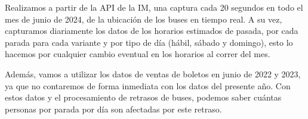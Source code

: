 \documentclass[journal]{IEEEtran}
\begin{document}
Realizamos a partir de la API de la IM, una captura cada 20 segundos en todo el mes de junio de 2024, de la ubicación de los buses en tiempo real. A su vez, capturamos diariamente los datos de los horarios estimados de pasada, por cada parada para cada variante y por tipo de día (hábil, sábado y domingo), esto lo hacemos por cualquier cambio eventual en los horarios al correr del mes.

Además, vamos a utilizar los datos de ventas de boletos en junio de 2022 y 2023, ya que no contaremos de forma inmediata con los datos del presente año. Con estos datos y el procesamiento de retrasos de buses, podemos saber cuántas personas por parada por día son afectadas por este retraso.





%
%

\end{document}
